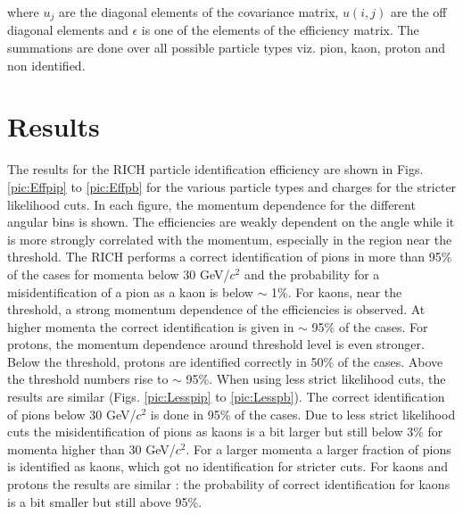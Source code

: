 where $u_j$ are the diagonal elements of the covariance matrix, $u(i,j)$ are the off diagonal elements and $\epsilon$ is one of the elements of the efficiency matrix. The summations are done over all possible particle types viz. pion, kaon, proton and non identified.

\section{Results} \label{sec:Results}

The results for the RICH particle identification efficiency are shown in Figs. \ref{pic:Effpip} to \ref{pic:Effpb} for the various particle types and charges for the stricter likelihood cuts. In each figure, the momentum dependence for the different angular bins is shown. The efficiencies are weakly dependent on the angle while it is more strongly correlated with the momentum, especially in the region near the threshold.
The RICH performs a correct identification of pions in more than 95\% of the cases for momenta below 30 GeV/$c^2$ and the probability for a misidentification of a pion as a kaon is below $\sim$ 1\%. For kaons, near the threshold, a strong momentum dependence of the efficiencies is observed. At higher momenta the correct identification is given in $\sim$ 95\% of the cases. For protons, the momentum dependence around threshold level is even stronger. Below the threshold, protons are identified correctly in 50\% of the cases. Above the threshold numbers rise to $\sim$ 95\%. When using less strict likelihood cuts, the results are similar (Figs. \ref{pic:Lesspip} to \ref{pic:Lesspb}). The correct identification of pions below 30 GeV/$c^2$ is done in 95\% of the cases. Due to less strict likelihood cuts the misidentification of pions as kaons is a bit larger but still below 3\% for momenta higher than 30 GeV/$c^2$. For a larger momenta a larger fraction of pions is identified as kaons, which got no identification for stricter cuts. For kaons and protons the results are similar : the probability of correct identification for kaons is a bit smaller but still above 95\%.

